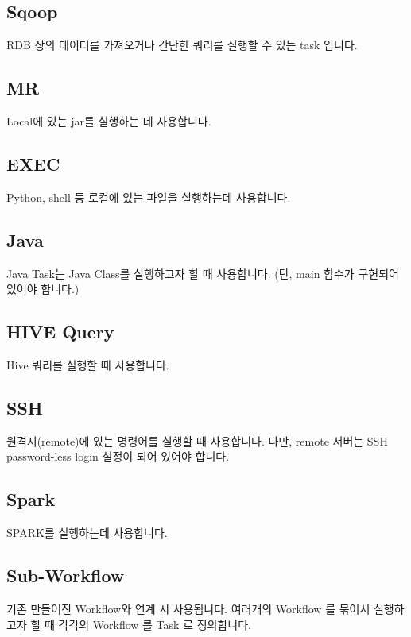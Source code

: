\documentclass[letterpaper,10pt,english]{sphinxmanual}
\begin{document}
\subsection{Sqoop}
\label{\detokenize{integrator/part03/tasks:sqoop}}
RDB 상의 데이터를 가져오거나 간단한 쿼리를 실행할 수 있는 task 입니다.


\subsection{MR}
\label{\detokenize{integrator/part03/tasks:mr}}
Local에 있는 jar를 실행하는 데 사용합니다.


\subsection{EXEC}
\label{\detokenize{integrator/part03/tasks:exec}}
Python, shell 등 로컬에 있는 파일을 실행하는데 사용합니다.


\subsection{Java}
\label{\detokenize{integrator/part03/tasks:java}}
Java Task는 Java Class를 실행하고자 할 때 사용합니다. (단, main 함수가 구현되어 있어야 합니다.)


\subsection{HIVE Query}
\label{\detokenize{integrator/part03/tasks:hive-query}}
Hive 쿼리를 실행할 때 사용합니다.


\subsection{SSH}
\label{\detokenize{integrator/part03/tasks:ssh}}
원격지(remote)에 있는 명령어를 실행할 때 사용합니다. 다만, remote 서버는 SSH password-less login 설정이 되어 있어야 합니다.


\subsection{Spark}
\label{\detokenize{integrator/part03/tasks:spark}}
SPARK를 실행하는데 사용합니다.


\subsection{Sub-Workflow}
\label{\detokenize{integrator/part03/tasks:sub-workflow}}
기존 만들어진 Workflow와 연계 시 사용됩니다. 여러개의 Workflow 를 묶어서 실행하고자 할 때 각각의 Workflow 를 Task 로 정의합니다.
\end{document}
